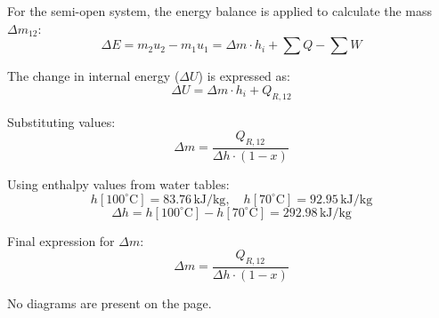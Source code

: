 For the semi-open system, the energy balance is applied to calculate the mass \( \Delta m_{12} \):  
\[
\Delta E = m_2 u_2 - m_1 u_1 = \Delta m \cdot h_i + \sum Q - \sum W
\]  

The change in internal energy (\( \Delta U \)) is expressed as:  
\[
\Delta U = \Delta m \cdot h_i + Q_{R,12}
\]  

Substituting values:  
\[
\Delta m = \frac{Q_{R,12}}{\Delta h \cdot (1 - x)}
\]  

Using enthalpy values from water tables:  
\[
h[100^\circ\text{C}] = 83.76 \, \text{kJ/kg}, \quad h[70^\circ\text{C}] = 92.95 \, \text{kJ/kg}
\]  
\[
\Delta h = h[100^\circ\text{C}] - h[70^\circ\text{C}] = 292.98 \, \text{kJ/kg}
\]  

Final expression for \( \Delta m \):  
\[
\Delta m = \frac{Q_{R,12}}{\Delta h \cdot (1 - x)}
\]  

No diagrams are present on the page.